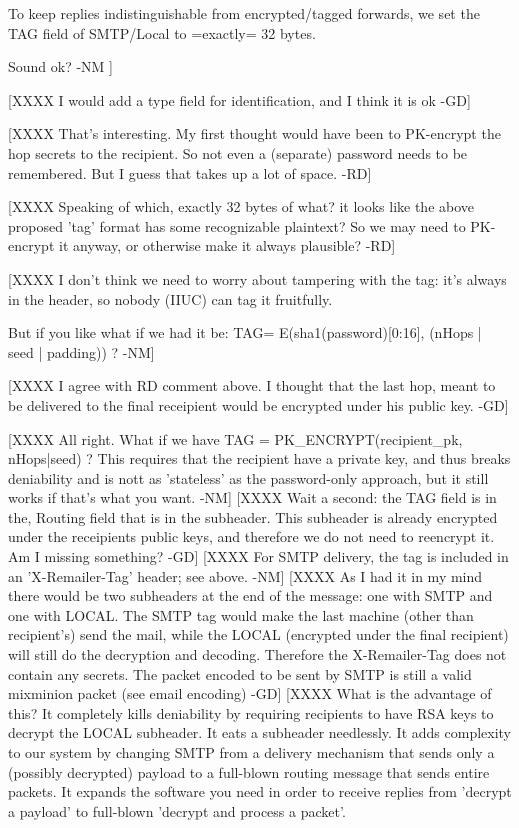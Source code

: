 	 To keep replies indistinguishable from encrypted/tagged
         forwards, we set the TAG field of SMTP/Local to =exactly=
         32 bytes.

         Sound ok?                                 -NM ]

[XXXX I would add a type field for identification, and I think it is
ok -GD]

[XXXX That's interesting. My first thought would have been to PK-encrypt
      the hop secrets to the recipient. So not even a (separate) password
      needs to be remembered. But I guess that takes up a lot of
      space. -RD]

[XXXX Speaking of which, exactly 32 bytes of what? it looks like the
      above proposed 'tag' format has some recognizable plaintext? So
      we may need to PK-encrypt it anyway, or otherwise make it always
      plausible? -RD]

[XXXX I don't think we need to worry about tampering with the tag:
      it's always in the header, so nobody (IIUC) can tag it fruitfully.

      But if you like what if we had it be:
        TAG= E(sha1(password)[0:16],  (nHops | seed | padding)) ? -NM]

[XXXX I agree with RD comment above.  I thought that the last hop, meant
 to be delivered to the final receipient would be encrypted under his public 
 key. -GD]

[XXXX All right.  What if we have 
         TAG = PK_ENCRYPT(recipient_pk, nHops|seed) ?  
      This requires
      that the recipient have a private key, and thus breaks
      deniability and is nott as 'stateless' as the password-only
      approach, but it still works if that's what you want.  -NM]
[XXXX Wait a second: the TAG field is in the, Routing field that is in the 
      subheader. This subheader is already encrypted under the receipients
      public keys, and therefore we do not need to reencrypt it.
      Am I missing something? -GD]
[XXXX For SMTP delivery, the tag is included in an 'X-Remailer-Tag'
      header; see above. -NM]
[XXXX As I had it in my mind there would be two subheaders at the end
         of the message: one with SMTP and one with LOCAL. The SMTP
         tag would make the last machine (other than recipient's) send
         the mail, while the LOCAL (encrypted under the final
         recipient) will still do the decryption and
         decoding. Therefore the X-Remailer-Tag does not contain any
         secrets. The packet encoded to be sent by SMTP is still a
         valid mixminion packet (see email encoding) -GD]
[XXXX What is the advantage of this?  It completely kills deniability
      by requiring recipients to have RSA keys to decrypt the LOCAL
      subheader.  It eats a subheader needlessly.  It adds
      complexity to our system by changing SMTP from a delivery
      mechanism that sends only a (possibly decrypted) payload to a
      full-blown routing message that sends entire packets.  It
      expands the software you need in order to receive replies from
      'decrypt a payload' to full-blown 'decrypt and process a packet'. 

